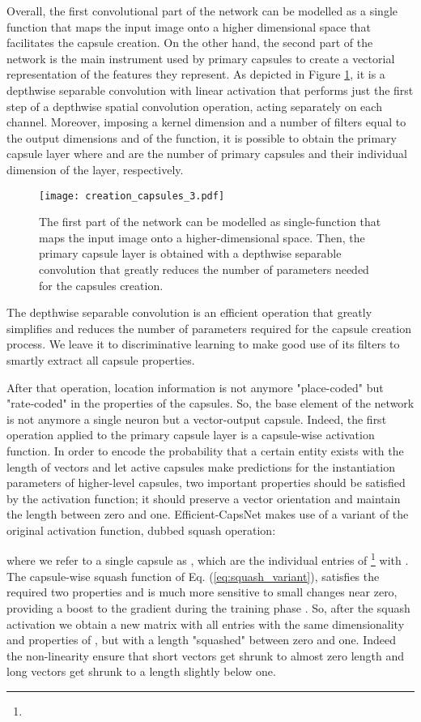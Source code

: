 \documentclass{article}
\begin{document}
Overall, the first convolutional part of the network can be modelled as a single function  that maps the input image onto a higher dimensional space that facilitates the capsule creation. On the other hand, the second part of the network is the main instrument used by primary capsules to create a vectorial representation of the features they represent. As depicted in Figure \ref{fig:creation_capsules}, it is a depthwise separable convolution with linear activation that performs just the first step of a depthwise spatial convolution operation, acting separately on each channel. Moreover, imposing a kernel dimension  and a number of filters  equal to the output dimensions  and  of the  function, it is possible to obtain the primary capsule layer 
 where  and  are the number of primary capsules and their individual dimension of the  layer, respectively.
\begin{figure}
    \centering
    \texttt{[image: creation\_capsules\_3.pdf]}
    \caption{The first part of the network can be modelled as single-function  that maps the input image onto a higher-dimensional space. Then, the primary capsule layer  is obtained with a depthwise separable convolution that greatly reduces the number of parameters needed for the capsules creation.}
    \label{fig:creation_capsules}
\end{figure}
The depthwise separable convolution is an efficient operation that greatly simplifies and reduces the number of parameters required for the capsule creation process. We leave it to discriminative learning to make good use of its filters to smartly extract all capsule properties.

After that operation, location information is not anymore "place-coded" but "rate-coded" in the properties of the capsules. So, the base element of the network is not anymore a single neuron but a vector-output capsule. Indeed, the first operation applied to the primary capsule layer is a capsule-wise activation function. In order to encode the probability that a certain entity exists with the length of vectors and let active capsules make predictions for the instantiation parameters of higher-level capsules, two important properties should be satisfied by the activation function; it should preserve a vector orientation and maintain the length between zero and one. Efficient-CapsNet makes use of a variant of the original activation function, dubbed squash operation:
\begin{ceqn}

\end{ceqn}
where we refer to a single capsule as , which are the individual entries  of \footnote[1]{} with . The capsule-wise squash function of Eq. (\ref{eq:squash_variant}), satisfies the required two properties and is much more sensitive to small changes near zero, providing a boost to the gradient during the training phase \cite{xi2017capsule}. So, after the squash activation we obtain a new matrix  with all  entries  with the same dimensionality and properties of , but with a length "squashed" between zero and one. Indeed the non-linearity ensure that short vectors get shrunk to almost zero length and long vectors get shrunk to a length slightly below one.
\end{document}
